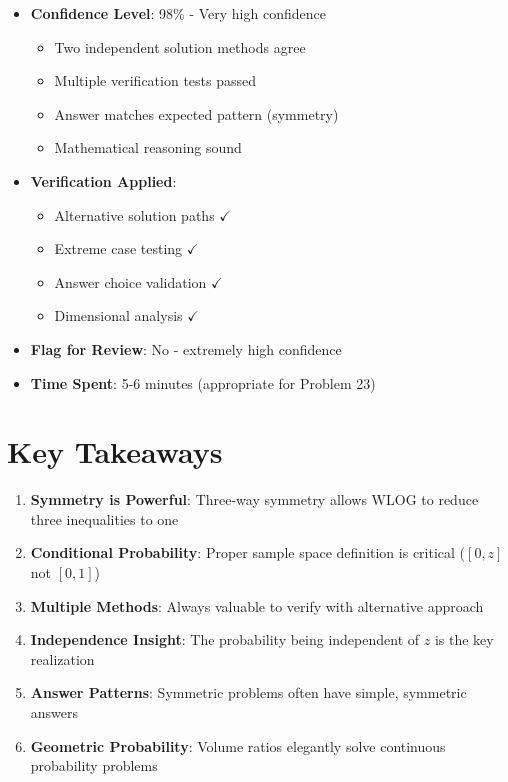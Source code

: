 \documentclass[11pt]{article}
\begin{document}
\begin{itemize}[leftmargin=*]
    \item \textbf{Confidence Level}: 98\% - Very high confidence
    \begin{itemize}
        \item Two independent solution methods agree
        \item Multiple verification tests passed
        \item Answer matches expected pattern (symmetry)
        \item Mathematical reasoning sound
    \end{itemize}
    \item \textbf{Verification Applied}: 
    \begin{itemize}
        \item Alternative solution paths $\checkmark$
        \item Extreme case testing $\checkmark$
        \item Answer choice validation $\checkmark$
        \item Dimensional analysis $\checkmark$
    \end{itemize}
    \item \textbf{Flag for Review}: No - extremely high confidence
    \item \textbf{Time Spent}: 5-6 minutes (appropriate for Problem 23)
\end{itemize}

\section*{Key Takeaways}

\begin{enumerate}
    \item \textbf{Symmetry is Powerful}: Three-way symmetry allows WLOG to reduce three inequalities to one
    \item \textbf{Conditional Probability}: Proper sample space definition is critical ($[0,z]$ not $[0,1]$)
    \item \textbf{Multiple Methods}: Always valuable to verify with alternative approach
    \item \textbf{Independence Insight}: The probability being independent of $z$ is the key realization
    \item \textbf{Answer Patterns}: Symmetric problems often have simple, symmetric answers
    \item \textbf{Geometric Probability}: Volume ratios elegantly solve continuous probability problems
\end{enumerate}
\end{document}

